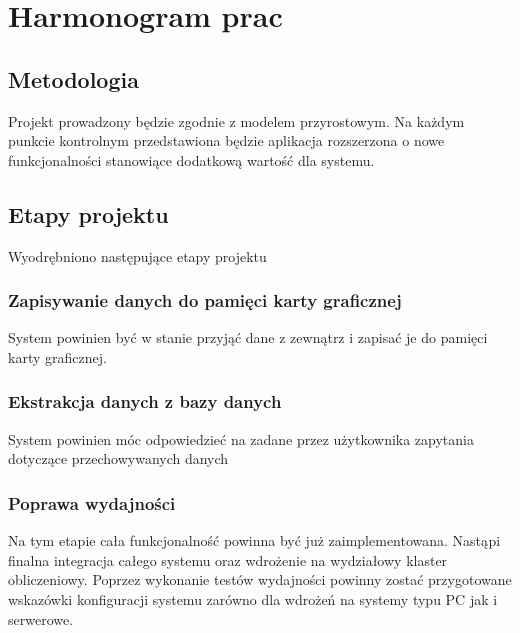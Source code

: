 \documentclass[paper=a4, fontsize=11pt]{scrartcl} %
\numberwithin{equation}{section} %
\numberwithin{figure}{section} %
\numberwithin{table}{section} %
\begin{document}
\section{Harmonogram prac}
    \subsection{Metodologia}
    Projekt prowadzony będzie zgodnie z modelem przyrostowym. Na każdym punkcie kontrolnym przedstawiona będzie
    aplikacja rozszerzona o nowe funkcjonalności stanowiące dodatkową wartość dla systemu.

    \subsection{Etapy projektu}
    Wyodrębniono następujące etapy projektu
        \subsubsection{Zapisywanie danych do pamięci karty graficznej}
            System powinien być w stanie przyjąć dane z zewnątrz i zapisać je do pamięci karty graficznej.
        \subsubsection{Ekstrakcja danych z bazy danych}
            System powinien móc odpowiedzieć na zadane przez użytkownika zapytania dotyczące przechowywanych danych
        \subsubsection{Poprawa wydajności}
            Na tym etapie cała funkcjonalność powinna być już zaimplementowana. Nastąpi finalna integracja całego systemu
            oraz wdrożenie na wydziałowy klaster obliczeniowy. Poprzez wykonanie testów wydajności powinny zostać
            przygotowane wskazówki konfiguracji systemu zarówno dla wdrożeń na systemy typu PC jak i serwerowe.
\end{document}
